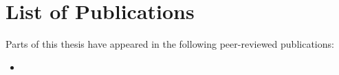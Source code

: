
\chapter*{List of Publications}

Parts of this thesis have appeared in the following peer-reviewed publications:

\begin{itemize}
	\item 
\end{itemize}
